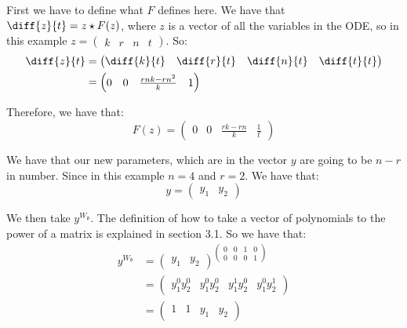 \documentclass[oneside, a4paper, onecolumn, 11pt]{article}
\begin{document}
First we have to define what \(F\) defines here. We have that \(\diff{z}{t} = z\star F(z)\), where \(z\) is a vector of all the variables in the ODE, so in this example \(z = \begin{pmatrix} k & r & n & t \end{pmatrix}\). So:
\begin{align*}
    \diff{z}{t}
     & = \begin{pmatrix}
             \diff{k}{t} & \diff{r}{t} & \diff{n}{t} & \diff{t}{t}
         \end{pmatrix} \\
     & = \begin{pmatrix}
             0 & 0 & \frac{rnk - rn^2}{k} & 1 \\
         \end{pmatrix}
\end{align*}

Therefore, we have that:
\[
    F(z) = \begin{pmatrix}
        0 & 0 & \frac{rk - rn}{k} & \frac{1}{t}
    \end{pmatrix}
\]

We have that our new parameters, which are in the vector \(y\) are going to be \(n - r\) in number. Since in this example \(n = 4\) and \(r = 2\). We have that:
\[
    y = \begin{pmatrix}
        y_1 & y_2
    \end{pmatrix}
\]

We then take \(y^{W_{\mathfrak{d}}}\). The definition of how to take a vector of polynomials to the power of a matrix is explained in section 3.1. So we have that:
\begin{align*}
    y^{W_{\mathfrak{d}}}
     & = \begin{pmatrix}
             y_1 & y_2
         \end{pmatrix}^{
    \begin{pmatrix}
        0 & 0 & 1 & 0 \\
        0 & 0 & 0 & 1
    \end{pmatrix}}                                             \\
     & = \begin{pmatrix}
             y_1^0 y_2^0 & y_1^0 y_2^0 & y_1^1 y_2^0 & y_1^0 y_2^1
         \end{pmatrix} \\
     & = \begin{pmatrix}
             1 & 1 & y_1 & y_2
         \end{pmatrix}
\end{align*}
\end{document}
